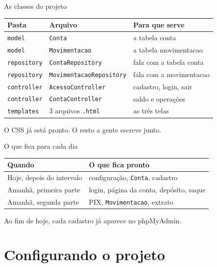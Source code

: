\documentclass[aspectratio=169,11pt]{beamer}
\begin{document}
\begin{frame}{As classes do projeto}
  \begin{center}
  \begin{tabular}{lll}
    \toprule
    Pasta & Arquivo & Para que serve \\
    \midrule
    \texttt{model} & \texttt{Conta} & a tabela conta \\
    \texttt{model} & \texttt{Movimentacao} & a tabela movimentacao \\
    \texttt{repository} & \texttt{ContaRepository} & fala com a tabela conta \\
    \texttt{repository} & \texttt{MovimentacaoRepository} & fala com a movimentacao \\
    \texttt{controller} & \texttt{AcessoController} & cadastro, login, sair \\
    \texttt{controller} & \texttt{ContaController} & saldo e operações \\
    \texttt{templates} & 3 arquivos \texttt{.html} & as três telas \\
    \bottomrule
  \end{tabular}
  \end{center}

  \vspace{0.5em}
  O CSS já está pronto. O resto a gente escreve junto.
\end{frame}

\begin{frame}{O que fica para cada dia}
  \begin{center}
  \begin{tabular}{ll}
    \toprule
    Quando & O que fica pronto \\
    \midrule
    Hoje, depois do intervalo & configuração, \texttt{Conta}, cadastro \\
    Amanhã, primeira parte & login, página da conta, depósito, saque \\
    Amanhã, segunda parte & PIX, \texttt{Movimentacao}, extrato \\
    \bottomrule
  \end{tabular}
  \end{center}

  \vspace{0.6em}
  Ao fim de hoje, cada cadastro já aparece no phpMyAdmin.
\end{frame}

\section{Configurando o projeto}
\end{document}
